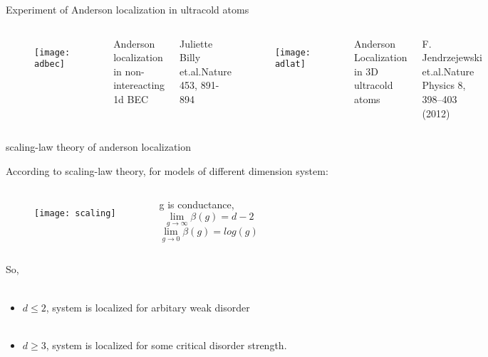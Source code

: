 \documentclass{beamer}
\begin{document}
\begin{frame}{Experiment of Anderson localization in ultracold atoms}
\begin{columns}
\begin{figure}
\texttt{[image: adbec]}
\end{figure}
\tiny{Anderson localization in non-intereacting 1d BEC\\~

Juliette Billy et.al.Nature 453, 891-894}
\begin{figure}
\texttt{[image: adlat]}
\end{figure}
\tiny{Anderson Localization in 3D ultracold atoms\\~

F. Jendrzejewski et.al.Nature Physics 8, 398–403 (2012)}
\end{columns}

\end{frame}

\begin{frame}{scaling-law theory of anderson localization}

According to scaling-law theory, for models of different dimension system:
\begin{columns}
\begin{figure}
\texttt{[image: scaling]}
\end{figure}
g is conductance, 
$$\lim_{g\to\infty}\beta(g)=d-2$$
$$\lim_{g\to0}\beta(g)=log(g)$$

\end{columns}
\end{frame}

\begin{frame}
So, \\~
\begin{itemize}

\item $d\leqslant 2$, system is localized for arbitary weak disorder\\~

\item $d\geqslant 3$, system is localized for some critical disorder strength.
\end{itemize}

\end{frame}
\end{document}

